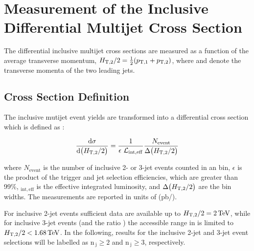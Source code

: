\chapter{Measurement of the Inclusive Differential Multijet Cross Section}
\label{chap:measurement}
The differential inclusive multijet cross sections are measured as a function of the average transverse momentum, $\httwo = \frac{1}{2}(\ptone + \pttwo)$, where \ptone and \pttwo denote the transverse momenta of the two leading jets.

\section{Cross Section Definition}
The inclusive mutijet event yields are transformed into a differential cross section which is defined as :

\begin{equation}
 \label{inclusive_formula}
 {\dd{\sigma}{\big(\httwo\big)}} = \frac{1}{\epsilon~\lumi_{\mathrm{int,eff}}}\frac{N_\mathrm{event}}{\Delta\big(\httwo\big)}
\end{equation}

where $N_\mathrm{event}$ is the number of inclusive 2- or 3-jet events counted in an \httwo bin, $\epsilon$ is the product of the trigger 
and jet selection efficiencies, which are greater than 99\%, \lumins$_{\mathrm{int,eff}}$ is the effective integrated luminosity, and $
\Delta\big(H_{\mathrm{T,2}}/2\big)$ are the bin widths. The measurements are reported in units of (pb/\GeV).

For inclusive 2-jet events sufficient data are available up to $H_{\mathrm{T,2}}/2 = 2\,\text{Te\hspace{-.08em}V}$, while for inclusive 3-jet events (and the ratio \ratio) 
the accessible range in \httwo is limited to $H_{\mathrm{T,2}}/2 < 1.68\,\text{Te\hspace{-.08em}V}$. In the following, results for the inclusive 2-jet and 3-jet event 
selections will be labelled as $\mathrm {n_{~j}} \geq 2$ and $\mathrm {n_{~j}} \geq 3$, respectively.

